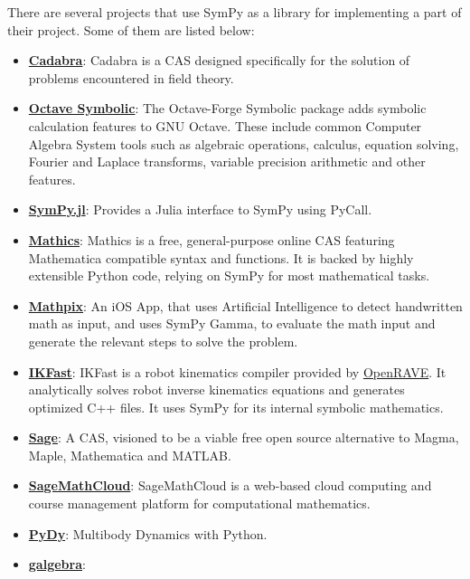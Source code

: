 There are several projects that use SymPy as a library for implementing
a part of their project. Some of them are listed below:

\begin{itemize}
\item
  \href{http://cadabra.science/index.html}{\textbf{Cadabra}}: Cadabra is
  a CAS designed specifically for the
  solution of problems encountered in field theory.
\item
  \href{http://octave.sourceforge.net/symbolic/}{\textbf{Octave Symbolic}}:
  The Octave-Forge Symbolic package adds symbolic calculation features
  to GNU Octave. These include common Computer Algebra System tools such
  as algebraic operations, calculus, equation solving, Fourier and
  Laplace transforms, variable precision arithmetic and other features.
\item
  \href{https://github.com/jverzani/SymPy.jl}{\textbf{SymPy.jl}}:
  Provides a Julia interface to SymPy using PyCall.
\item
  \href{https://mathics.github.io/}{\textbf{Mathics}}: Mathics is a
  free, general-purpose online CAS featuring Mathematica compatible
  syntax and functions. It is backed by highly extensible Python code,
  relying on SymPy for most mathematical tasks.
\item
  \href{http://mathpix.com/}{\textbf{Mathpix}}: An iOS App, that uses
  Artificial Intelligence to detect handwritten math as input, and uses
  SymPy Gamma, to evaluate the math input and generate the relevant
  steps to solve the problem.
\item
  \href{http://openrave.org/docs/0.8.2/openravepy/ikfast/}{\textbf{IKFast}}:
  IKFast is a robot kinematics compiler provided by
  \href{http://openrave.org/}{OpenRAVE}. It analytically solves robot inverse
  kinematics equations and generates optimized C++ files. It uses SymPy for
  its internal symbolic mathematics.
\item
  \href{http://www.sagemath.org/}{\textbf{Sage}}: A CAS, visioned to be
  a viable free open source alternative to Magma, Maple, Mathematica and
  MATLAB\@.
\item
  \href{https://cloud.sagemath.com}{\textbf{SageMathCloud}}:
  SageMathCloud is a web-based cloud computing and course management
  platform for computational mathematics.
\item
  \href{http://www.pydy.org/}{\textbf{PyDy}}: Multibody Dynamics with
  Python.
\item
  \href{https://github.com/brombo/galgebra}{\textbf{galgebra}}:

\end{itemize}
